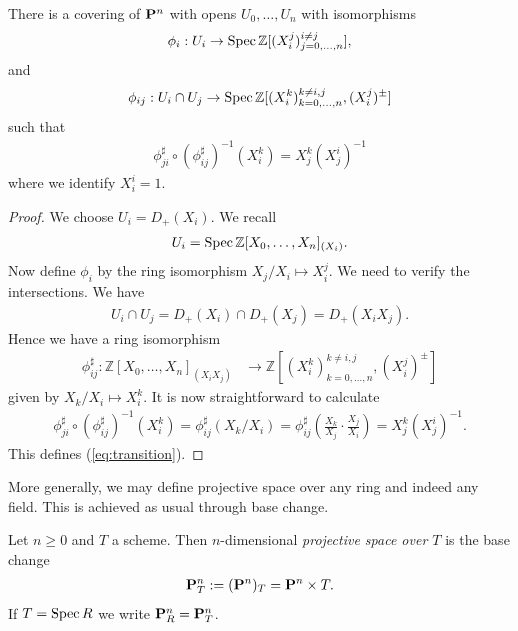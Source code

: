 \documentclass{article}
\begin{document}
\begin{lemma}\label{lem:affine_cover}
  There is a covering of $\mathbf{P}^{n}_{}$ with opens
  $U_0,\ldots,U_n$ with isomorphisms
  \begin{align*}
    \phi_i : U_i \to \operatorname{Spec}\mathbb{Z}[(X_i^j)_{j=0,\ldots,n}^{i\neq j}],
  \end{align*}
  and
  \begin{align}\label{eq:transition}
    \phi_{ij} : U_i \cap U_j \to \operatorname{Spec}\mathbb{Z}[(X_i^k)_{k=0,\ldots,n}^{k\neq i,j}, (X_i^j)^\pm]
  \end{align}
  such that
  \begin{align*}
    \phi^\sharp_{ji}\circ{\left(\phi^\sharp_{ij}\right)}^{-1} (X_i^k) = X_j^k{(X^i_j)}^{-1}
  \end{align*}
  where we identify $X_i^i = 1$.
  \begin{proof}
    We choose $U_i = D_+(X_i)$. We recall
    \begin{align*}
      U_i = \operatorname{Spec}\mathbb{Z}[X_0,\ldots,X_n]_{(X_i)}.
    \end{align*}
    Now define $\phi_i$ by the ring isomorphism
    $X_j/X_i \mapsto X_i^j$. We need to verify the intersections.
    We have
    \begin{align*}
      U_i \cap U_j
      = D_+(X_i)\cap D_+(X_j)
      = D_+(X_i X_j).
    \end{align*}
    Hence we have a ring isomorphism
    \begin{align*}
      \phi_{ij}^\sharp : \mathbb{Z}[X_0,\ldots,X_n]_{(X_iX_j)}
      &\to \mathbb{Z}[(X_i^k)_{k=0,\ldots,n}^{k\neq i,j}, (X_i^j)^\pm]
    \end{align*}
    given by
    $X_k/X_i \mapsto X_i^k$. It is now straightforward to calculate
    \begin{align*}
      \phi^\sharp_{ji}\circ{\left(\phi^\sharp_{ij}\right)}^{-1}(X^k_i)
      = \phi_{ij}^\sharp (X_k/X_i)
      = \phi_{ij}^\sharp \left({\frac{X_k}{X_j}\cdot\frac{X_j}{X_i}}\right)
      = X^k_j {(X_j^i)}^{-1}.
    \end{align*}
    This defines (\ref{eq:transition}).
  \end{proof}
\end{lemma}

More generally, we may define projective space over any ring and
indeed any field. This is achieved as usual through base change.

\begin{definition}
  Let $n\geq 0$ and $T$ a scheme. Then $n$-dimensional
  \emph{projective space over $T$} is the base change
  \begin{align*}
    \mathbf{P}^{n}_{T} := (\mathbf{P}^{n}_{})_T = \mathbf{P}^{n}_{}\times T.
  \end{align*}
  If $T=\operatorname{Spec} R$ we write $\mathbf{P}^{n}_{R}=\mathbf{P}^{n}_{T}$.
\end{definition}
\end{document}
